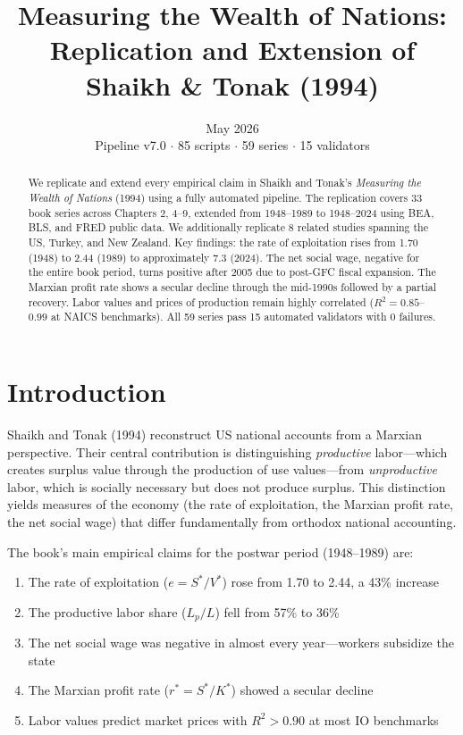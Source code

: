 \documentclass[12pt,a4paper]{article}
\title{Measuring the Wealth of Nations:\\
\large Replication and Extension of Shaikh \& Tonak (1994)}
\date{May 2026 \\ \small{Pipeline v7.0 $\cdot$ 85 scripts $\cdot$ 59 series $\cdot$ 15 validators}}
\begin{document}
\maketitle

\begin{abstract}
We replicate and extend every empirical claim in Shaikh and Tonak's \textit{Measuring the Wealth of Nations} (1994) using a fully automated pipeline. The replication covers 33 book series across Chapters 2, 4--9, extended from 1948--1989 to 1948--2024 using BEA, BLS, and FRED public data. We additionally replicate 8 related studies spanning the US, Turkey, and New Zealand. Key findings: the rate of exploitation rises from 1.70 (1948) to 2.44 (1989) to approximately 7.3 (2024). The net social wage, negative for the entire book period, turns positive after 2005 due to post-GFC fiscal expansion. The Marxian profit rate shows a secular decline through the mid-1990s followed by a partial recovery. Labor values and prices of production remain highly correlated ($R^2 = 0.85$--$0.99$ at NAICS benchmarks). All 59 series pass 15 automated validators with 0 failures.
\end{abstract}

\tableofcontents
\newpage

\section{Introduction}

Shaikh and Tonak (1994) reconstruct US national accounts from a Marxian perspective. Their central contribution is distinguishing \textit{productive} labor---which creates surplus value through the production of use values---from \textit{unproductive} labor, which is socially necessary but does not produce surplus. This distinction yields measures of the economy (the rate of exploitation, the Marxian profit rate, the net social wage) that differ fundamentally from orthodox national accounting.

The book's main empirical claims for the postwar period (1948--1989) are:
\begin{enumerate}
\item The rate of exploitation ($e = S^*/V^*$) rose from 1.70 to 2.44, a 43\% increase
\item The productive labor share ($L_p/L$) fell from 57\% to 36\%
\item The net social wage was negative in almost every year---workers subsidize the state
\item The Marxian profit rate ($r^* = S^*/K^*$) showed a secular decline
\item Labor values predict market prices with $R^2 > 0.90$ at most IO benchmarks
\end{enumerate}
\end{document}
